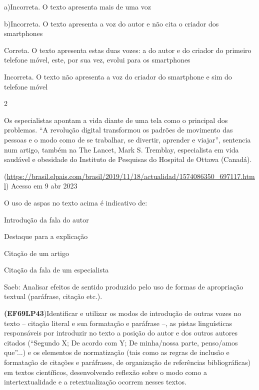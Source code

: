 {a)Incorreta. O texto apresenta mais de uma voz

b)Incorreta. O texto apresenta a voz do autor e não cita o criador dos
smartphones

\item
  Correta. O texto apresenta estas duas vozes: a do autor e do criador
  do primeiro telefone móvel, este, por sua vez, evolui para os
  smartphones
\item
  Incorreta. O texto não apresenta a voz do criador do smartphone e sim
  do telefone móvel

\num{2}

Os especialistas apontam a vida diante de uma tela como o principal dos
problemas. ``A revolução digital transformou os padrões de movimento das
pessoas e o modo como de se trabalhar, se divertir, aprender e viajar'',
sentencia num artigo, também na The Lancet, Mark S. Tremblay,
especialista em vida saudável e obesidade do Instituto de Pesquisas do
Hospital de Ottawa (Canadá).

(\href{https://brasil.elpais.com/brasil/2019/11/18/actualidad/1574086350_697117.html}{\uline{https://brasil.elpais.com/brasil/2019/11/18/actualidad/1574086350\_697117.html}})
Acesso em 9 abr 2023

O uso de aspas no texto acima é indicativo de:

\begin{escolha}

\item
  Introdução da fala do autor
\item
  Destaque para a explicação
\item
  Citação de um artigo
\item
  Citação da fala de um especialista
\end{escolha}

Saeb: Analisar efeitos de sentido produzido pelo uso de formas de
apropriação textual (paráfrase, citação etc.).

\textbf{(EF69LP43})Identificar e utilizar os modos de introdução de
outras vozes no texto -- citação literal e sua formatação e paráfrase
--, as pistas linguísticas responsáveis por introduzir no texto a
posição do autor e dos outros autores citados (``Segundo X; De acordo
com Y; De minha/nossa parte, penso/amos que''...) e os elementos de
normatização (tais como as regras de inclusão e formatação de citações e
paráfrases, de organização de referências bibliográficas) em textos
científicos, desenvolvendo reflexão sobre o modo como a
intertextualidade e a retextualização ocorrem nesses textos.

}
